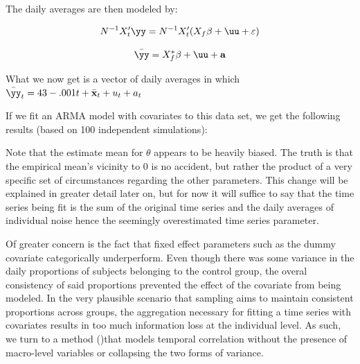 The daily averages are then modeled by:

\begin{equation}
    \label{armanem_averaged1}
    N^{-1}X_t'\yy = N^{-1}X_t'(X_f\beta + \uu + \varepsilon)
\end{equation}

\begin{equation}
    \label{armanem_averaged2}
    \bar{\yy} = X_f^*\beta + \uu + \mathbf{a}
\end{equation}

What we now get is a vector of daily averages in which $\bar{\yy}_t = 43 -.001t + \bar{\mathbf{x}}_t + u_t + a_t $

If we fit an ARMA model with covariates to this data set, we get the following results (based on 100 independent simulations):



 
Note that the estimate mean for $\theta$ appears to be heavily biased. The truth is that the empirical mean's vicinity to 0 is no accident, but rather the product of a very specific set of circumstances regarding the other parameters. This change will be explained in greater detail later on, but for now it will suffice to say that the time series being fit is the sum of the original time series and the daily averages of individual noise hence the seemingly overestimated time series parameter.

Of greater concern is the fact that fixed effect parameters such as the dummy covariate categorically underperform. Even though there was some variance in the daily proportions of subjects belonging to the control group, the overal consistency of said proportions prevented the effect of the covariate from being modeled. In the very plausible scenario that sampling aims to maintain consistent proportions across groups, the aggregation necessary for fitting a time series with covariates results in too much information loss at the individual level. As such, we turn to a method (\citep{modugno2015multilevel})that models temporal correlation without the presence of macro-level variables or collapsing the two forms of variance.